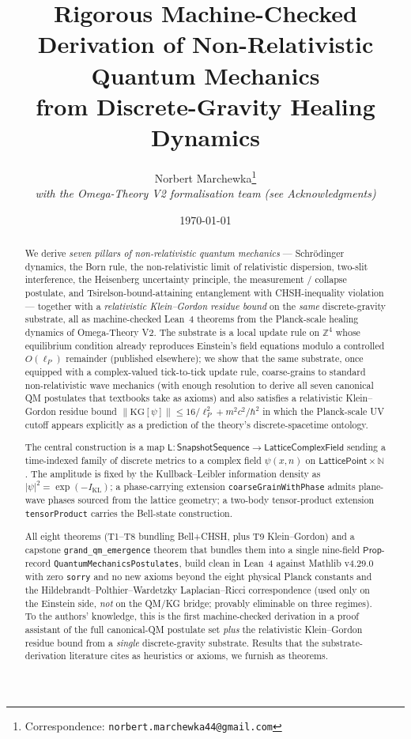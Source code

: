 \documentclass[11pt,a4paper,twoside]{article}
\title{%
  \Large\bfseries
  Rigorous Machine-Checked Derivation of Non-Relativistic Quantum Mechanics\\
  from Discrete-Gravity Healing Dynamics
}
\author{%
  Norbert Marchewka\thanks{Correspondence: \texttt{norbert.marchewka44@gmail.com}}\\
  \small\emph{with the Omega-Theory V2 formalisation team (see Acknowledgments)}
}
\date{\today}
\theoremstyle{definition}
\newcommand{\KL}{I_{\mathrm{KL}}}
\newcommand{\Nbb}{\mathbb{N}}
\newcommand{\Zbb}{\mathbb{Z}}
\newcommand{\lP}{\ell_P}
\newcommand{\Lmap}{\mathsf{L}}
\newcommand{\Lfield}{\mathsf{LatticeComplexField}}
\newcommand{\SnapSeq}{\mathsf{SnapshotSequence}}
\newcommand{\code}[1]{\texttt{#1}}
\newcommand{\Prop}{\mathsf{Prop}}
\begin{document}
\maketitle

\begin{abstract}\noindent
We derive \emph{seven pillars of non-relativistic quantum mechanics}
--- Schr\"odinger dynamics, the Born rule, the non-relativistic limit
of relativistic dispersion, two-slit interference, the Heisenberg
uncertainty principle, the measurement / collapse postulate, and
Tsirelson-bound-attaining entanglement with CHSH-inequality violation
--- together with a \emph{relativistic Klein--Gordon residue bound} on
the \emph{same} discrete-gravity substrate, all as machine-checked
Lean~4 theorems from the Planck-scale healing dynamics of
Omega-Theory V2. The substrate is a local update rule on $\Zbb^{4}$
whose equilibrium condition already reproduces Einstein's field
equations modulo a controlled $O(\lP)$ remainder (published
elsewhere); we show that the same substrate, once equipped with a
complex-valued tick-to-tick update rule, coarse-grains to standard
non-relativistic wave mechanics (with enough resolution to derive all
seven canonical QM postulates that textbooks take as axioms) and also
satisfies a relativistic Klein--Gordon residue bound
$\|\mathrm{KG}[\psi]\| \le 16/\lP^{2} + m^{2}c^{2}/\hbar^{2}$ in which
the Planck-scale UV cutoff appears explicitly as a prediction of the
theory's discrete-spacetime ontology.
\par\vspace{4pt}
The central construction is a map
$\Lmap:\SnapSeq\to\Lfield$ sending a time-indexed family of discrete
metrics to a complex field $\psi(x,n)$ on $\mathsf{LatticePoint}\times\Nbb$.
The amplitude is fixed by the Kullback--Leibler information density as
$|\psi|^{2}=\exp(-\KL)$; a phase-carrying extension
\code{coarseGrainWithPhase} admits plane-wave phases sourced from the
lattice geometry; a two-body tensor-product extension
\code{tensorProduct} carries the Bell-state construction.
\par\vspace{4pt}
All eight theorems (T1--T8 bundling Bell+CHSH, plus T9 Klein--Gordon)
and a capstone \code{grand\_qm\_emergence} theorem that bundles them
into a single nine-field $\Prop$-record
\code{QuantumMechanicsPostulates}, build clean in Lean~4 against
Mathlib v4.29.0 with zero \code{sorry} and no new axioms beyond the
eight physical Planck constants and the
Hildebrandt--Polthier--Wardetzky Laplacian--Ricci correspondence
(used only on the Einstein side, \emph{not} on the QM/KG bridge;
provably eliminable on three regimes). To the authors' knowledge,
this is the first machine-checked derivation in a proof assistant of
the full canonical-QM postulate set \emph{plus} the relativistic
Klein--Gordon residue bound from a \emph{single} discrete-gravity
substrate. Results that the substrate-derivation literature cites as
heuristics or axioms, we furnish as theorems.
\end{abstract}
\end{document}
